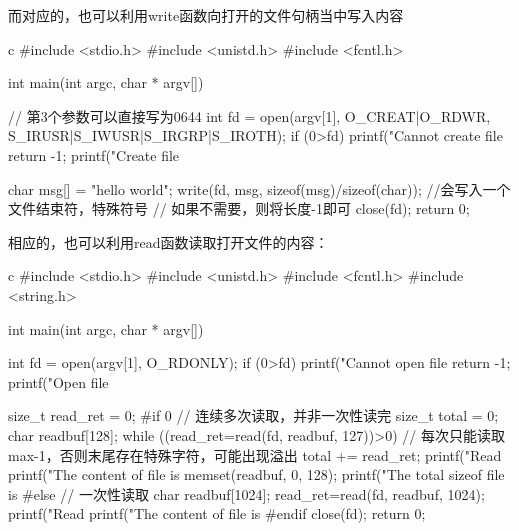 而对应的，也可以利用write函数向打开的文件句柄当中写入内容
\begin{code-block}{c}
#include <stdio.h>
#include <unistd.h>
#include <fcntl.h>

int main(int argc, char * argv[])
{
        // 第3个参数可以直接写为0644
        int fd = open(argv[1], O_CREAT|O_RDWR,
                S_IRUSR|S_IWUSR|S_IRGRP|S_IROTH);
        if (0>fd)
        {
                printf("Cannot create file %
                return -1;
        }
        printf("Create file %

        char msg[] = "hello world";
        write(fd, msg, sizeof(msg)/sizeof(char)); //会写入一个文件结束符，特殊符号
                                                  // 如果不需要，则将长度-1即可
        close(fd);
        return 0;
}
\end{code-block}

相应的，也可以利用read函数读取打开文件的内容：
\begin{code-block}{c}
#include <stdio.h>
#include <unistd.h>
#include <fcntl.h>
#include <string.h>

int main(int argc, char * argv[])
{
        int fd = open(argv[1], O_RDONLY);
        if (0>fd)
        {
                printf("Cannot open file %
                return -1;
        }
        printf("Open file %

        size_t read_ret = 0;
#if 0
        // 连续多次读取，并非一次性读完
        size_t total = 0;
        char readbuf[128];
        while ((read_ret=read(fd, readbuf, 127))>0) // 每次只能读取max-1，否则末尾存在特殊字符，可能出现溢出
        {
                total += read_ret;
                printf("Read %
                printf("The content of file is %
                memset(readbuf, 0, 128);
        }
        printf("The total sizeof file is %
#else
        // 一次性读取
        char readbuf[1024];
        read_ret=read(fd, readbuf, 1024);
        printf("Read %
        printf("The content of file is %
#endif
        close(fd);
        return 0;
}
\end{code-block}

